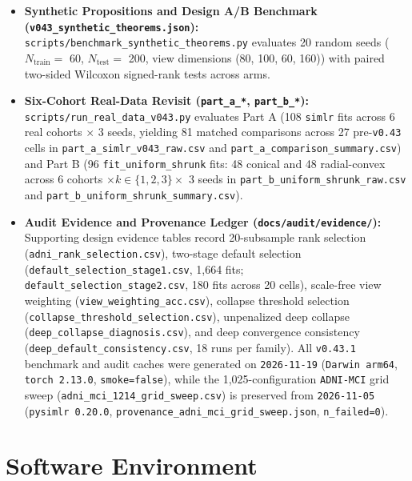 \documentclass[
  10pt,
  letterpaper,
]{report}
\providecommand{\tightlist}{%
  \setlength{\itemsep}{0pt}\setlength{\parskip}{0pt}}
\begin{document}
\begin{itemize}
\tightlist
\item
  \textbf{Synthetic Propositions and Design A/B Benchmark
  (\texttt{v043\_synthetic\_theorems.json}):}
  \texttt{scripts/benchmark\_synthetic\_theorems.py} evaluates 20 random
  seeds (\(N_{\text{train}} =\) 60, \(N_{\text{test}} =\) 200, view
  dimensions (80, 100, 60, 160)) with paired two-sided Wilcoxon
  signed-rank tests across arms.
\item
  \textbf{Six-Cohort Real-Data Revisit (\texttt{part\_a\_*},
  \texttt{part\_b\_*}):} \texttt{scripts/run\_real\_data\_v043.py}
  evaluates Part A (108 \texttt{simlr} fits across 6 real cohorts
  \(\times\) 3 seeds, yielding 81 matched comparisons across 27
  pre-\texttt{v0.43} cells in \texttt{part\_a\_simlr\_v043\_raw.csv} and
  \texttt{part\_a\_comparison\_summary.csv}) and Part B (96
  \texttt{fit\_uniform\_shrunk} fits: 48 conical and 48 radial-convex
  across 6 cohorts \(\times k \in \{1, 2, 3\} \times\) 3 seeds in
  \texttt{part\_b\_uniform\_shrunk\_raw.csv} and
  \texttt{part\_b\_uniform\_shrunk\_summary.csv}).
\item
  \textbf{Audit Evidence and Provenance Ledger
  (\texttt{docs/audit/evidence/}):} Supporting design evidence tables
  record 20-subsample rank selection
  (\texttt{adni\_rank\_selection.csv}), two-stage default selection
  (\texttt{default\_selection\_stage1.csv}, 1,664 fits;
  \texttt{default\_selection\_stage2.csv}, 180 fits across 20 cells),
  scale-free view weighting (\texttt{view\_weighting\_acc.csv}),
  collapse threshold selection
  (\texttt{collapse\_threshold\_selection.csv}), unpenalized deep
  collapse (\texttt{deep\_collapse\_diagnosis.csv}), and deep
  convergence consistency (\texttt{deep\_default\_consistency.csv}, 18
  runs per family). All \texttt{v0.43.1} benchmark and audit caches were
  generated on \texttt{2026-11-19} (\texttt{Darwin\ arm64},
  \texttt{torch\ 2.13.0}, \texttt{smoke=false}), while the
  1,025-configuration \texttt{ADNI-MCI} grid sweep
  (\texttt{adni\_mci\_1214\_grid\_sweep.csv}) is preserved from
  \texttt{2026-11-05} (\texttt{pysimlr\ 0.20.0},
  \texttt{provenance\_adni\_mci\_grid\_sweep.json},
  \texttt{n\_failed=0}).
\end{itemize}

\section*{Software Environment}\label{software-environment}
\end{document}
